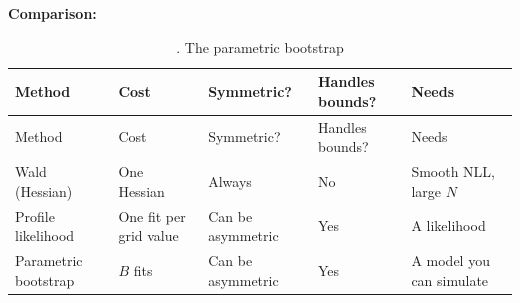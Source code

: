 \textbf{Comparison:}

\begin{longtable}[]{@{}
  >{\raggedright\arraybackslash}p{}
  >{\raggedright\arraybackslash}p{}
  >{\raggedright\arraybackslash}p{}
  >{\raggedright\arraybackslash}p{}
  >{\raggedright\arraybackslash}p{}@{}}
\caption{. The parametric bootstrap}\tabularnewline
\toprule\noalign{}
\begin{minipage}[b]{\linewidth}\raggedright
Method
\end{minipage} & \begin{minipage}[b]{\linewidth}\raggedright
Cost
\end{minipage} & \begin{minipage}[b]{\linewidth}\raggedright
Symmetric?
\end{minipage} & \begin{minipage}[b]{\linewidth}\raggedright
Handles bounds?
\end{minipage} & \begin{minipage}[b]{\linewidth}\raggedright
Needs
\end{minipage} \\
\midrule\noalign{}
\endfirsthead
\toprule\noalign{}
\begin{minipage}[b]{\linewidth}\raggedright
Method
\end{minipage} & \begin{minipage}[b]{\linewidth}\raggedright
Cost
\end{minipage} & \begin{minipage}[b]{\linewidth}\raggedright
Symmetric?
\end{minipage} & \begin{minipage}[b]{\linewidth}\raggedright
Handles bounds?
\end{minipage} & \begin{minipage}[b]{\linewidth}\raggedright
Needs
\end{minipage} \\
\midrule\noalign{}
\endhead
\bottomrule\noalign{}
\endlastfoot
Wald (Hessian) & One Hessian & Always & No & Smooth NLL, large \(N\) \\
Profile likelihood & One fit per grid value & Can be asymmetric & Yes &
A likelihood \\
Parametric bootstrap & \(B\) fits & Can be asymmetric & Yes & A model
you can simulate \\
\end{longtable}

